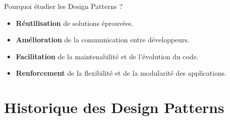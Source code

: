 \documentclass[aspectratio=169]{beamer}
\begin{document}
\begin{frame}{Pourquoi étudier les Design Patterns ?}
    \begin{itemize}
        \item \textbf{Réutilisation} de solutions éprouvées.
        \item \textbf{Amélioration} de la communication entre développeurs.
        \item \textbf{Facilitation} de la maintenabilité et de l'évolution du code.
        \item \textbf{Renforcement} de la flexibilité et de la modularité des applications.
    \end{itemize}
\end{frame}

\section{Historique des Design Patterns}
\end{document}
